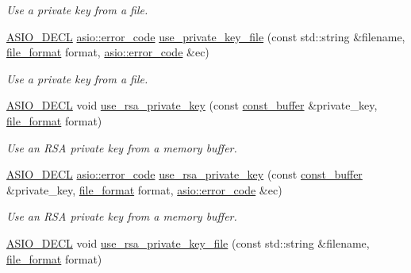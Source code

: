 \begin{DoxyCompactItemize}
\begin{DoxyCompactList}\small\item\em Use a private key from a file. \end{DoxyCompactList}\item 
\hyperlink{config_8hpp_ab54d01ea04afeb9a8b39cfac467656b7}{A\+S\+I\+O\+\_\+\+D\+E\+C\+L} \hyperlink{classasio_1_1error__code}{asio\+::error\+\_\+code} \hyperlink{classasio_1_1ssl_1_1context_aa1055bfc3e866478ce5ab08f25eab0a1}{use\+\_\+private\+\_\+key\+\_\+file} (const std\+::string \&filename, \hyperlink{classasio_1_1ssl_1_1context__base_acc846aa73fffcab1fecad36dcf2be1fb}{file\+\_\+format} format, \hyperlink{classasio_1_1error__code}{asio\+::error\+\_\+code} \&ec)
\begin{DoxyCompactList}\small\item\em Use a private key from a file. \end{DoxyCompactList}\item 
\hyperlink{config_8hpp_ab54d01ea04afeb9a8b39cfac467656b7}{A\+S\+I\+O\+\_\+\+D\+E\+C\+L} void \hyperlink{classasio_1_1ssl_1_1context_a2f5b985a1f94472ecc1e9f3092fe64ee}{use\+\_\+rsa\+\_\+private\+\_\+key} (const \hyperlink{classasio_1_1const__buffer}{const\+\_\+buffer} \&private\+\_\+key, \hyperlink{classasio_1_1ssl_1_1context__base_acc846aa73fffcab1fecad36dcf2be1fb}{file\+\_\+format} format)
\begin{DoxyCompactList}\small\item\em Use an R\+S\+A private key from a memory buffer. \end{DoxyCompactList}\item 
\hyperlink{config_8hpp_ab54d01ea04afeb9a8b39cfac467656b7}{A\+S\+I\+O\+\_\+\+D\+E\+C\+L} \hyperlink{classasio_1_1error__code}{asio\+::error\+\_\+code} \hyperlink{classasio_1_1ssl_1_1context_aa69351ac1528baad5c4c65407bdcf839}{use\+\_\+rsa\+\_\+private\+\_\+key} (const \hyperlink{classasio_1_1const__buffer}{const\+\_\+buffer} \&private\+\_\+key, \hyperlink{classasio_1_1ssl_1_1context__base_acc846aa73fffcab1fecad36dcf2be1fb}{file\+\_\+format} format, \hyperlink{classasio_1_1error__code}{asio\+::error\+\_\+code} \&ec)
\begin{DoxyCompactList}\small\item\em Use an R\+S\+A private key from a memory buffer. \end{DoxyCompactList}\item 
\hyperlink{config_8hpp_ab54d01ea04afeb9a8b39cfac467656b7}{A\+S\+I\+O\+\_\+\+D\+E\+C\+L} void \hyperlink{classasio_1_1ssl_1_1context_abf4477dd0845cd440e08e45a4ff583cf}{use\+\_\+rsa\+\_\+private\+\_\+key\+\_\+file} (const std\+::string \&filename, \hyperlink{classasio_1_1ssl_1_1context__base_acc846aa73fffcab1fecad36dcf2be1fb}{file\+\_\+format} format)

\end{DoxyCompactItemize}
